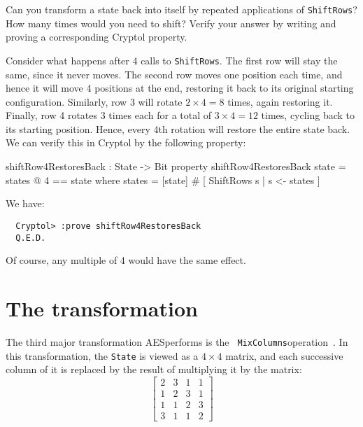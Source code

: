 \begin{Exercise}\label{ex:aesshiftrows:0}
  Can you transform a state back into itself by repeated applications
  of {\tt ShiftRows}? How many times would you need to shift?  Verify
  your answer by writing and proving a corresponding Cryptol property.
\end{Exercise}
\begin{Answer}
  Consider what happens after 4 calls to {\tt ShiftRows}. The first
  row will stay the same, since it never moves. The second row moves
  one position each time, and hence it will move 4 positions at the
  end, restoring it back to its original starting
  configuration. Similarly, row 3 will rotate $2\times4=8$ times,
  again restoring it. Finally, row 4 rotates 3 times each for a total
  of $3\times4 = 12$ times, cycling back to its starting
  position. Hence, every 4th rotation will restore the entire state
  back. We can verify this in Cryptol by the following property:
\begin{code}
  shiftRow4RestoresBack : State -> Bit
  property shiftRow4RestoresBack state = states @ 4 == state
     where states = [state] # [ ShiftRows s | s <- states ]
\end{code}
We have:
\begin{Verbatim}
  Cryptol> :prove shiftRow4RestoresBack
  Q.E.D.
\end{Verbatim}
Of course, any multiple of 4 would have the same effect.
\end{Answer}

\section{The {} transformation}
\label{sec:aesmixcolumns}

The third major transformation AES\indAES performs is the {\tt
  MixColumns}\indAESMixColumns operation~\cite[Section 5.1.3]{aes}.
In this transformation, the {\tt State} is viewed as a $4\times4$
matrix, and each successive column of it is replaced by the result of
multiplying it by the matrix:
$$
\left[ \begin{array}{cccc} 2 & 3 & 1 & 1 \\ 1 & 2 & 3 & 1 \\ 1 & 1 & 2 & 3 \\ 3 & 1 & 1 & 2 \end{array} \right]
$$

